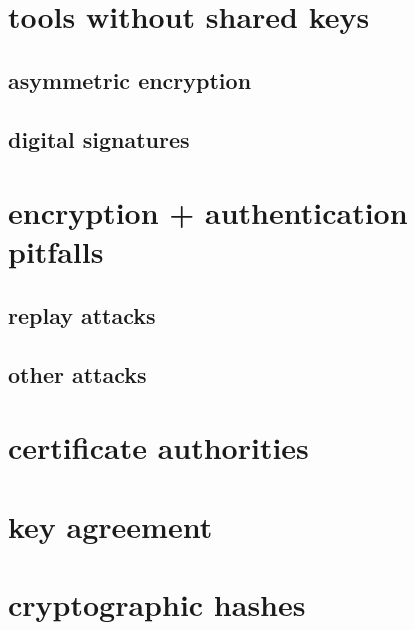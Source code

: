 \section{tools without shared keys}

\subsection{asymmetric encryption}



\subsection{digital signatures}



\section{encryption + authentication pitfalls}



\subsection{replay attacks}



\subsection{other attacks}



\section{certificate authorities}



\section{key agreement}



\section{cryptographic hashes}

